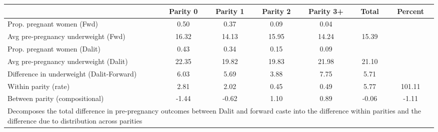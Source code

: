 \begin{tabular}{l*{6}{c}}
\toprule
            &\multicolumn{1}{c}{Parity 0}&\multicolumn{1}{c}{Parity 1}&\multicolumn{1}{c}{Parity 2}&\multicolumn{1}{c}{Parity 3+}&\multicolumn{1}{c}{Total}&\multicolumn{1}{c}{Percent}\\
\midrule
\midrule
Prop. pregnant women (Fwd)&        0.50&        0.37&        0.09&        0.04&            &            \\
Avg pre-pregnancy underweight (Fwd)&       16.32&       14.13&       15.95&       14.24&       15.39&            \\
Prop. pregnant women (Dalit)&        0.43&        0.34&        0.15&        0.09&            &            \\
Avg pre-pregnancy underweight (Dalit)&       22.35&       19.82&       19.83&       21.98&       21.10&            \\
Difference in underweight (Dalit-Forward)&        6.03&        5.69&        3.88&        7.75&        5.71&            \\
Within parity (rate)&        2.81&        2.02&        0.45&        0.49&        5.77&      101.11\\
Between parity (compositional)&       -1.44&       -0.62&        1.10&        0.89&       -0.06&       -1.11\\
\bottomrule
\multicolumn{7}{l}{\footnotesize Decomposes the total difference in pre-pregnancy outcomes between Dalit and forward caste into the difference within parities and the difference due to distribution across parities}\\
\end{tabular}
